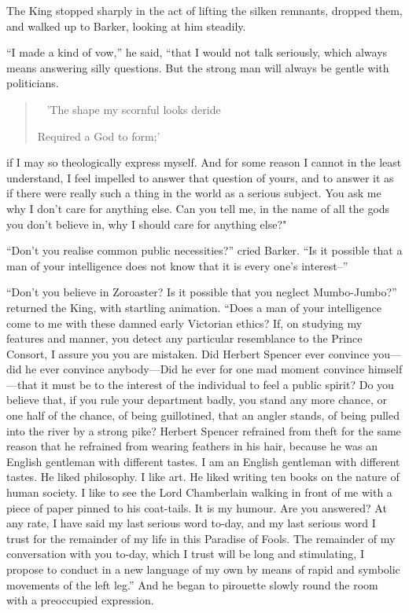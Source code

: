 \documentclass{book}
\newenvironment{mdblockquote}{%
  \begin{quotation}
    \
}{%
  \end{quotation}
}
\begin{document}
The King stopped sharply in the act of lifting the silken remnants, dropped them, and walked up to Barker, looking at him steadily.

“I made a kind of vow,” he said, “that I would not talk seriously, which always means answering silly questions. But the strong man will always be gentle with politicians.

\begin{mdblockquote}
	’The shape my scornful looks deride

	Required a God to form;’


\end{mdblockquote}
if I may so theologically express myself. And for some reason I cannot in the least understand, I feel impelled to answer that question of yours, and to answer it as if there were really such a thing in the world as a serious subject. You ask me why I don’t care for anything else. Can you tell me, in the name of all the gods you don’t believe in, why I should care for anything else?"

“Don’t you realise common public necessities?” cried Barker. “Is it possible that a man of your intelligence does not know that it is every one’s interest–”

“Don’t you believe in Zoroaster? Is it possible that you neglect Mumbo-Jumbo?” returned the King, with startling animation. “Does a man of your intelligence come to me with these damned early Victorian ethics? If, on studying my features and manner, you detect any particular resemblance to the Prince Consort, I assure you you are mistaken. Did Herbert Spencer ever convince you—did he ever convince anybody—Did he ever for one mad moment convince himself—that it must be to the interest of the individual to feel a public spirit? Do you believe that, if you rule your department badly, you stand any more chance, or one half of the chance, of being guillotined, that an angler stands, of being pulled into the river by a strong pike? Herbert Spencer refrained from theft for the same reason that he refrained from wearing feathers in his hair, because he was an English gentleman with different tastes. I am an English gentleman with different tastes. He liked philosophy. I like art. He liked writing ten books on the nature of human society. I like to see the Lord Chamberlain walking in front of me with a piece of paper pinned to his coat-tails. It is my humour. Are you answered? At any rate, I have said my last serious word to-day, and my last serious word I trust for the remainder of my life in this Paradise of Fools. The remainder of my conversation with you to-day, which I trust will be long and stimulating, I propose to conduct in a new language of my own by means of rapid and symbolic movements of the left leg.” And he began to pirouette slowly round the room with a preoccupied expression.
\end{document}
